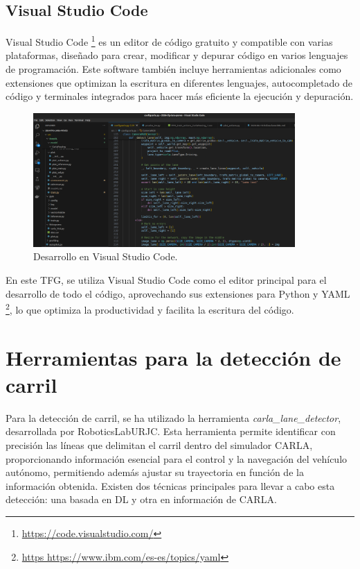 \subsection{Visual Studio Code}
\label{sec:vs_code}

Visual Studio Code \footnote{\url{https://code.visualstudio.com/}} es un editor de código gratuito y compatible con varias plataformas, diseñado para crear, modificar y depurar código en varios lenguajes de programación. Este software también incluye herramientas adicionales como extensiones que optimizan la escritura en diferentes lenguajes, autocompletado de código y terminales integrados para hacer más eficiente la ejecución y depuración.

\begin{figure}[ht]
  \begin{center}
    \includegraphics[width=10cm]{figs/Plataformas_Desarollo/visual_code.png}
  \end{center}
  \caption{Desarrollo en Visual Studio Code.}
  \label{foto_code}
\end{figure}

En este \ac{TFG}, se utiliza Visual Studio Code como el editor principal para el desarrollo de todo el código, aprovechando sus extensiones para Python y YAML \footnote{\url{https https://www.ibm.com/es-es/topics/yaml}}, lo que optimiza la productividad y facilita la escritura del código.

\section{Herramientas para la detección de carril}
\label{sec:herramientas_carril}

Para la detección de carril, se ha utilizado la herramienta \textit{carla\_lane\_detector}, desarrollada por RoboticsLabURJC. Esta herramienta permite identificar con precisión las líneas que delimitan el carril dentro del simulador CARLA, proporcionando información esencial para el control y la navegación del vehículo autónomo, permitiendo además ajustar su trayectoria en función de la información obtenida. Existen dos técnicas principales para llevar a cabo esta detección: una basada en \ac{DL} y otra en información de CARLA.

